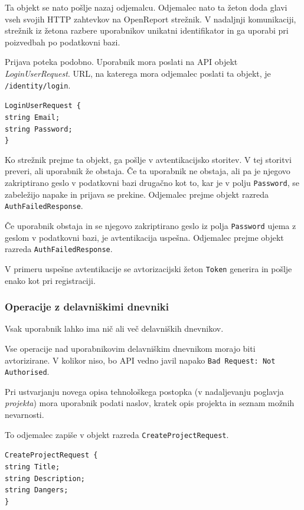 \documentclass[a4paper, 12pt]{book}
\begin{document}
Ta objekt se nato pošlje nazaj odjemalcu.
Odjemalec nato ta žeton doda glavi vseh svojih HTTP zahtevkov na OpenReport strežnik.
V nadaljnji komunikaciji, strežnik iz žetona razbere uporabnikov unikatni identifikator in ga uporabi pri poizvedbah po podatkovni bazi.

Prijava poteka podobno.
Uporabnik mora poslati na API objekt \textit{LoginUserRequest}.
URL, na katerega mora odjemalec poslati ta objekt, je \texttt{/identity/login}.

\noindent
\texttt{LoginUserRequest \{ \\
  string Email; \\
  string Password; \\
\} }

Ko strežnik prejme ta objekt, ga pošlje v avtentikacijsko storitev.
V tej storitvi preveri, ali uporabnik že obstaja.
Če ta uporabnik ne obstaja, ali pa je njegovo zakriptirano geslo v podatkovni bazi drugačno kot to, kar je v polju \texttt{Password}, se zabeležijo napake in prijava se prekine.
Odjemalec prejme objekt razreda \texttt{AuthFailedResponse}.

Če uporabnik obstaja in se njegovo zakriptirano geslo iz polja \texttt{Password} ujema z geslom v podatkovni bazi, je avtentikacija uspešna.
Odjemalec prejme objekt razreda \texttt{AuthFailedResponse}.

V primeru uspešne avtentikacije se avtorizacijski žeton \texttt{Token} generira in pošlje enako kot pri registraciji.

\subsubsection{Operacije z delavniškimi dnevniki}

Vsak uporabnik lahko ima nič ali več delavniških dnevnikov.

Vse operacije nad uporabnikovim delavniškim dnevnikom morajo biti avtorizirane.
V kolikor niso, bo API vedno javil napako \texttt{Bad Request: Not Authorised}.

Pri ustvarjanju novega opisa tehnološkega postopka (v nadaljevanju poglavja \textit{projekta}) mora uporabnik podati naslov, kratek opis projekta in seznam možnih nevarnosti.

To odjemalec zapiše v objekt razreda \texttt{CreateProjectRequest}.

\noindent \texttt{CreateProjectRequest \{ \\
string Title; \\ 
string Description; \\
string Dangers; \\
\} }
\end{document}
